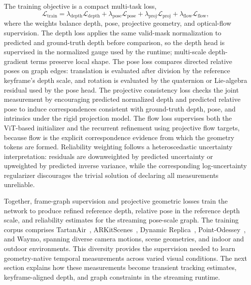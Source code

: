 The training objective is a compact multi-task loss,
\begin{equation}
    \mathcal{L}_{\mathrm{train}}
    =
    \lambda_{\mathrm{depth}} \mathcal{L}_{\mathrm{depth}}
    +
    \lambda_{\mathrm{pose}} \mathcal{L}_{\mathrm{pose}}
    +
    \lambda_{\mathrm{proj}} \mathcal{L}_{\mathrm{proj}}
    +
    \lambda_{\mathrm{flow}} \mathcal{L}_{\mathrm{flow}},
    \label{eq:geont_training_objective}
\end{equation}
where the weights balance depth, pose, projective geometry, and optical-flow supervision.
The depth loss applies the same valid-mask normalization to predicted and ground-truth depth before comparison, so the depth head is supervised in the normalized gauge used by the runtime; multi-scale depth-gradient terms preserve local shape.
The pose loss compares directed relative poses on graph edges: translation is evaluated after division by the reference keyframe's depth scale, and rotation is evaluated by the quaternion or Lie-algebra residual used by the pose head.
The projective consistency loss checks the joint measurement by encouraging predicted normalized depth and predicted relative pose to induce correspondences consistent with ground-truth depth, pose, and intrinsics under the rigid projection model.
The flow loss supervises both the ViT-based initializer and the recurrent refinement using projective flow targets, because flow is the explicit correspondence evidence from which the geometry tokens are formed.
Reliability weighting follows a heteroscedastic uncertainty interpretation: residuals are downweighted by predicted uncertainty or upweighted by predicted inverse variance, while the corresponding log-uncertainty regularizer discourages the trivial solution of declaring all measurements unreliable.

Together, frame-graph supervision and projective geometric losses train the network to produce refined reference depth, relative pose in the reference depth scale, and reliability estimates for the streaming pose-scale graph.
The training corpus comprises TartanAir~\cite{tartanair2020iros}, ARKitScenes~\cite{baruch2021arkitscenes}, Dynamic Replica~\cite{karaev2023dynamicstereo}, Point-Odessey~\cite{zheng2023pointodyssey}, and Waymo, spanning diverse camera motions, scene geometries, and indoor and outdoor environments.
This diversity provides the supervision needed to learn geometry-native temporal measurements across varied visual conditions.
The next section explains how these measurements become transient tracking estimates, keyframe-aligned depth, and graph constraints in the streaming runtime.

